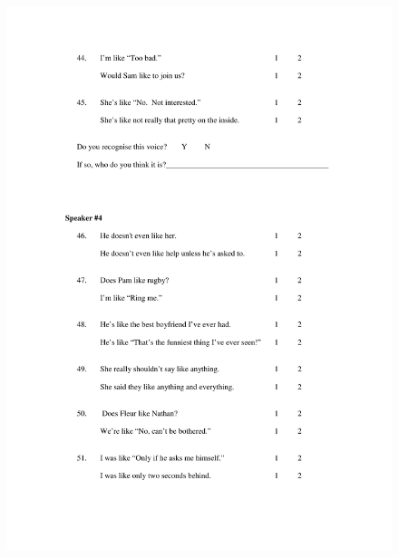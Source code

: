 \begin{figure}
	\centering
		\includegraphics[width=5in]{images/Exp2page6.pdf}
			\label{x2p6}
\end{figure}

